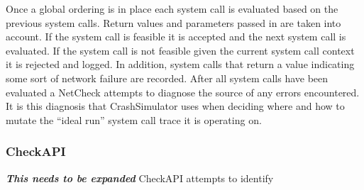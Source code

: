             Once a global ordering is in place each system call is evaluated based on the previous system calls. Return
            values and parameters passed in are taken into account. If the system call is feasible it is accepted and
            the next system call is evaluated. If the system call is not feasible given the current system call context
            it is rejected and logged. In addition, system calls that return a value indicating some sort of network
            failure are recorded. After all system calls have been evaluated a NetCheck attempts to diagnose the
            source of any errors encountered. It is this diagnosis that CrashSimulator uses when deciding where and how
            to mutate the ``ideal run'' system call trace it is operating on.

        \subsubsection{CheckAPI}

            \textbf{\emph{This needs to be expanded}}
            CheckAPI attempts to identify
